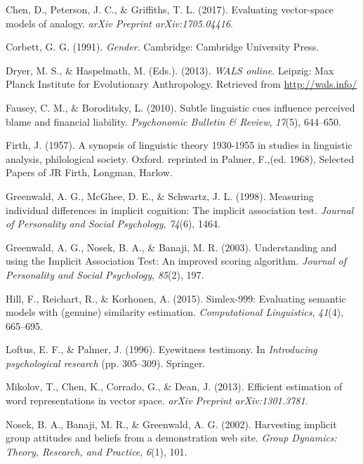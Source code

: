 \documentclass[10pt, letterpaper]{article}
\begin{document}
\hypertarget{ref-chen2017evaluating}{}
Chen, D., Peterson, J. C., \& Griffiths, T. L. (2017). Evaluating
vector-space models of analogy. \emph{arXiv Preprint arXiv:1705.04416}.

\hypertarget{ref-corbett1991}{}
Corbett, G. G. (1991). \emph{Gender}. Cambridge: Cambridge University
Press.

\hypertarget{ref-wals}{}
Dryer, M. S., \& Haspelmath, M. (Eds.). (2013). \emph{WALS online}.
Leipzig: Max Planck Institute for Evolutionary Anthropology. Retrieved
from \url{http://wals.info/}

\hypertarget{ref-fausey2010subtle}{}
Fausey, C. M., \& Boroditsky, L. (2010). Subtle linguistic cues
influence perceived blame and financial liability. \emph{Psychonomic
Bulletin \& Review}, \emph{17}(5), 644--650.

\hypertarget{ref-firth1957synopsis}{}
Firth, J. (1957). A synopsis of linguistic theory 1930-1955 in studies
in linguistic analysis, philological society. Oxford. reprinted in
Palmer, F.,(ed. 1968), Selected Papers of JR Firth, Longman, Harlow.

\hypertarget{ref-greenwald1998measuring}{}
Greenwald, A. G., McGhee, D. E., \& Schwartz, J. L. (1998). Measuring
individual differences in implicit cognition: The implicit association
test. \emph{Journal of Personality and Social Psychology}, \emph{74}(6),
1464.

\hypertarget{ref-greenwald2003understanding}{}
Greenwald, A. G., Nosek, B. A., \& Banaji, M. R. (2003). Understanding
and using the Implicit Association Test: An improved scoring algorithm.
\emph{Journal of Personality and Social Psychology}, \emph{85}(2), 197.

\hypertarget{ref-hill2015simlex}{}
Hill, F., Reichart, R., \& Korhonen, A. (2015). Simlex-999: Evaluating
semantic models with (genuine) similarity estimation.
\emph{Computational Linguistics}, \emph{41}(4), 665--695.

\hypertarget{ref-loftus1996eyewitness}{}
Loftus, E. F., \& Palmer, J. (1996). Eyewitness testimony. In
\emph{Introducing psychological research} (pp. 305--309). Springer.

\hypertarget{ref-mikolov2013efficient}{}
Mikolov, T., Chen, K., Corrado, G., \& Dean, J. (2013). Efficient
estimation of word representations in vector space. \emph{arXiv Preprint
arXiv:1301.3781}.

\hypertarget{ref-nosek2002harvesting}{}
Nosek, B. A., Banaji, M. R., \& Greenwald, A. G. (2002). Harvesting
implicit group attitudes and beliefs from a demonstration web site.
\emph{Group Dynamics: Theory, Research, and Practice}, \emph{6}(1), 101.
\end{document}
